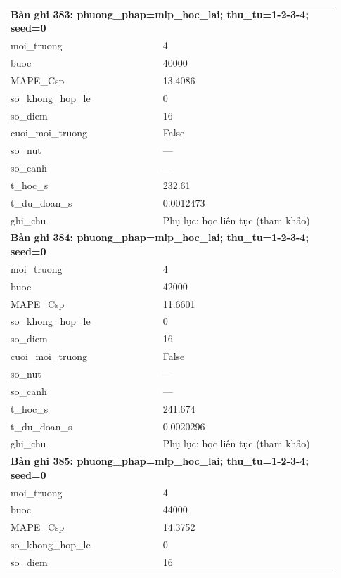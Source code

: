 \begin{longtable}{p{0.43\linewidth}p{0.50\linewidth}}
\midrule
\multicolumn{2}{p{0.95\linewidth}}{\textbf{Bản ghi 383: phuong\_phap=mlp\_hoc\_lai; thu\_tu=1-2-3-4; seed=0}} \\
moi\_\allowbreak truong & 4 \\
buoc & 40000 \\
MAPE\_\allowbreak Csp & 13.4086 \\
so\_\allowbreak khong\_\allowbreak hop\_\allowbreak le & 0 \\
so\_\allowbreak diem & 16 \\
cuoi\_\allowbreak moi\_\allowbreak truong & False \\
so\_\allowbreak nut & — \\
so\_\allowbreak canh & — \\
t\_\allowbreak hoc\_\allowbreak s & 232.61 \\
t\_\allowbreak du\_\allowbreak doan\_\allowbreak s & 0.0012473 \\
ghi\_\allowbreak chu & Phụ lục: học liên tục (tham khảo) \\
\midrule
\multicolumn{2}{p{0.95\linewidth}}{\textbf{Bản ghi 384: phuong\_phap=mlp\_hoc\_lai; thu\_tu=1-2-3-4; seed=0}} \\
moi\_\allowbreak truong & 4 \\
buoc & 42000 \\
MAPE\_\allowbreak Csp & 11.6601 \\
so\_\allowbreak khong\_\allowbreak hop\_\allowbreak le & 0 \\
so\_\allowbreak diem & 16 \\
cuoi\_\allowbreak moi\_\allowbreak truong & False \\
so\_\allowbreak nut & — \\
so\_\allowbreak canh & — \\
t\_\allowbreak hoc\_\allowbreak s & 241.674 \\
t\_\allowbreak du\_\allowbreak doan\_\allowbreak s & 0.0020296 \\
ghi\_\allowbreak chu & Phụ lục: học liên tục (tham khảo) \\
\midrule
\multicolumn{2}{p{0.95\linewidth}}{\textbf{Bản ghi 385: phuong\_phap=mlp\_hoc\_lai; thu\_tu=1-2-3-4; seed=0}} \\
moi\_\allowbreak truong & 4 \\
buoc & 44000 \\
MAPE\_\allowbreak Csp & 14.3752 \\
so\_\allowbreak khong\_\allowbreak hop\_\allowbreak le & 0 \\
so\_\allowbreak diem & 16 \\

\end{longtable}
